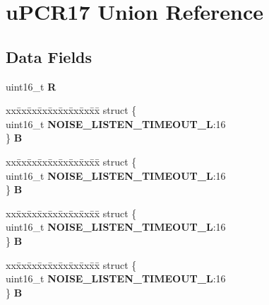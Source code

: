 \hypertarget{unionuPCR17}{}\section{u\+P\+C\+R17 Union Reference}
\label{unionuPCR17}
\subsection*{Data Fields}
\begin{DoxyCompactItemize}
\item 
\mbox{\label{unionuPCR17_aabbf11b648ee06e5a73da6bc16d59f67}} 
uint16\+\_\+t {\bfseries R}
\item 
\mbox{\label{unionuPCR17_a3af7fc9b7eb76130da0c471f3895f8b9}} 
\begin{tabbing}
xx\=xx\=xx\=xx\=xx\=xx\=xx\=xx\=xx\=\kill
struct \{\\
\>uint16\_t {\bfseries NOISE\_LISTEN\_TIMEOUT\_L}:16\\
\} {\bfseries B}\\

\end{tabbing}\item 
\mbox{\label{unionuPCR17_a1d2576ce2b3c4450904b04f50a6790f5}} 
\begin{tabbing}
xx\=xx\=xx\=xx\=xx\=xx\=xx\=xx\=xx\=\kill
struct \{\\
\>uint16\_t {\bfseries NOISE\_LISTEN\_TIMEOUT\_L}:16\\
\} {\bfseries B}\\

\end{tabbing}\item 
\mbox{\label{unionuPCR17_a7addf4ee9c48aa99ed74d0fb767e54e2}} 
\begin{tabbing}
xx\=xx\=xx\=xx\=xx\=xx\=xx\=xx\=xx\=\kill
struct \{\\
\>uint16\_t {\bfseries NOISE\_LISTEN\_TIMEOUT\_L}:16\\
\} {\bfseries B}\\

\end{tabbing}\item 
\mbox{\label{unionuPCR17_a57807931610a4eece8268f227605481e}} 
\begin{tabbing}
xx\=xx\=xx\=xx\=xx\=xx\=xx\=xx\=xx\=\kill
struct \{\\
\>uint16\_t {\bfseries NOISE\_LISTEN\_TIMEOUT\_L}:16\\
\} {\bfseries B}\\

\end{tabbing}\end{DoxyCompactItemize}


